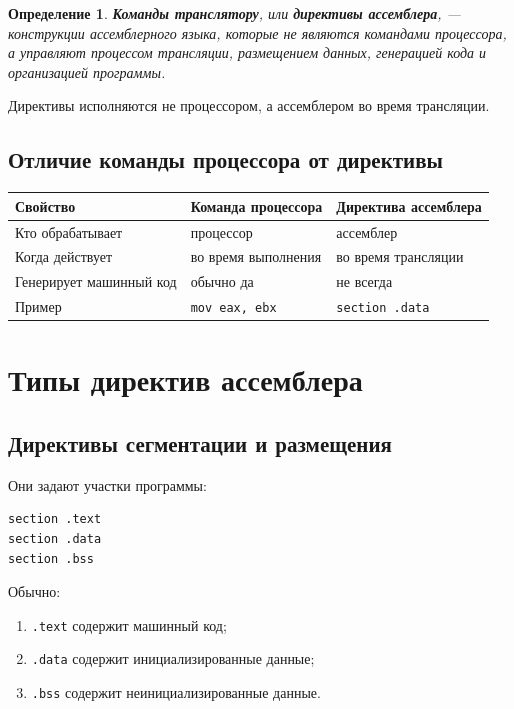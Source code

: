 \documentclass[12pt,a4paper]{article}
\newtheorem{definition}{Определение}
\begin{document}
\begin{definition}
\textbf{Команды транслятору}, или \textbf{директивы ассемблера}, --- конструкции ассемблерного языка, которые не являются командами процессора, а управляют процессом трансляции, размещением данных, генерацией кода и организацией программы.
\end{definition}

Директивы исполняются не процессором, а ассемблером во время трансляции.

\subsection{Отличие команды процессора от директивы}

\begin{center}
\begin{tabular}{lll}
\toprule
Свойство & Команда процессора & Директива ассемблера \\
\midrule
Кто обрабатывает & процессор & ассемблер \\
Когда действует & во время выполнения & во время трансляции \\
Генерирует машинный код & обычно да & не всегда \\
Пример & \texttt{mov eax, ebx} & \texttt{section .data} \\
\bottomrule
\end{tabular}
\end{center}

\section{Типы директив ассемблера}

\subsection{Директивы сегментации и размещения}

Они задают участки программы:

\begin{lstlisting}
section .text
section .data
section .bss
\end{lstlisting}

Обычно:

\begin{enumerate}
    \item \texttt{.text} содержит машинный код;
    \item \texttt{.data} содержит инициализированные данные;
    \item \texttt{.bss} содержит неинициализированные данные.
\end{enumerate}
\end{document}
